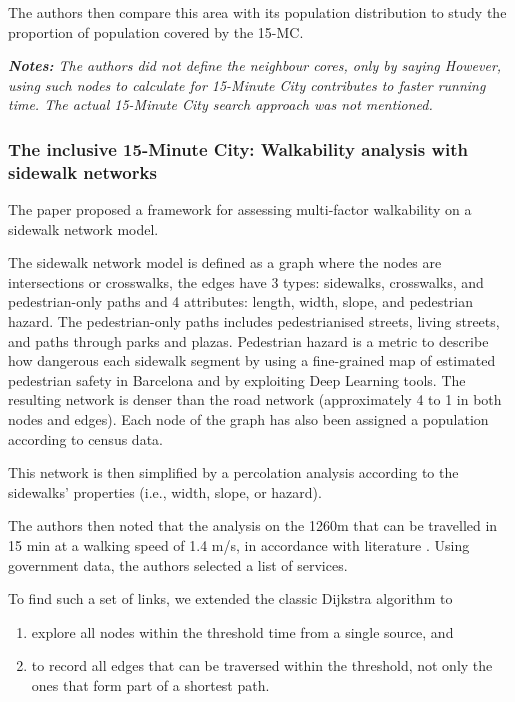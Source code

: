 The authors then compare this area with its population distribution to study the proportion of population covered by the 15-MC.

\textit{\textbf{Notes:} The authors did not define the neighbour cores, only by saying  However, using such nodes to calculate for 15-Minute City contributes to faster running time. The actual 15-Minute City search approach was not mentioned.}

\subsubsection{The inclusive 15-Minute City: Walkability analysis with sidewalk networks \texorpdfstring{\cite{rhoads_inclusive_2023}}{}} \label{rhoads_inclusive_2023}

The paper proposed a framework for assessing multi-factor walkability on a sidewalk network model. 

The sidewalk network model is defined as a graph where the nodes are intersections or crosswalks, the edges have 3 types: sidewalks, crosswalks, and pedestrian-only paths and 4 attributes: length, width, slope, and pedestrian hazard. The pedestrian-only paths includes pedestrianised streets, living streets, and paths through parks and plazas. Pedestrian hazard is a metric to describe how dangerous each sidewalk segment by using a fine-grained map of estimated pedestrian safety in Barcelona \cite{bustos_explainable_2021} and by exploiting Deep Learning tools. The resulting network is denser than the road network (approximately 4 to 1 in both nodes and edges). Each node of the graph has also been assigned a population according to census data.

This network is then simplified by a percolation analysis according to the sidewalks’ properties (i.e., width, slope, or hazard).

The authors then noted that the analysis on the 1260m that can be travelled in 15 min at a walking speed of 1.4 m/s, in accordance with literature \cite{bosina_estimating_2017}. Using government data, the authors selected a list of services.

To find such a set of links, we extended the classic Dijkstra algorithm to

\begin{enumerate}
\item explore all nodes within the threshold time from a single source, and
\item to record all edges that can be traversed within the threshold, not only the ones that form part of a shortest path.
\end{enumerate}

